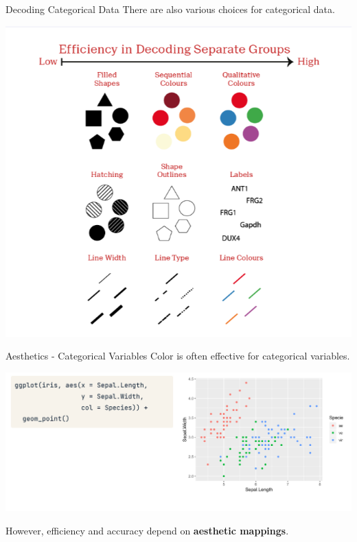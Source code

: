 \documentclass[
  ignorenonframetext,
]{beamer}
\begin{document}
\begin{frame}{Decoding Categorical Data}
\label{decoding-categorical-data}
There are also various choices for categorical data.

\includegraphics{../images/im180.png}
\end{frame}

\begin{frame}{Aesthetics - Categorical Variables}
\label{aesthetics---categorical-variables}
Color is often effective for categorical variables.

\includegraphics{../images/im181.png}

However, efficiency and accuracy depend on \textbf{aesthetic mappings}.
\end{frame}
\end{document}
